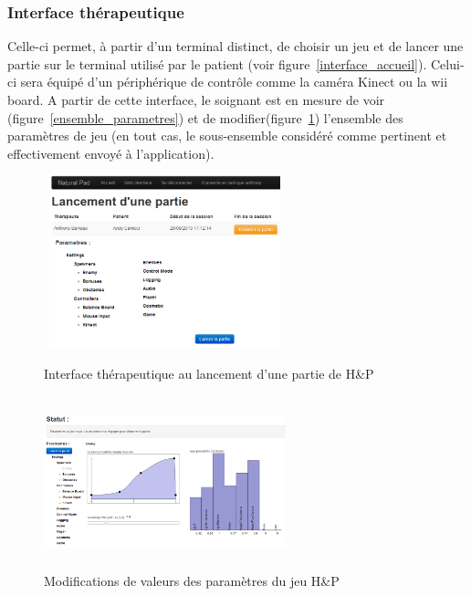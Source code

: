 	\subsubsection*{Interface thérapeutique}
Celle-ci permet, à partir d'un terminal distinct, de choisir un jeu et de lancer une partie sur le terminal utilisé par le patient (voir figure~\ref{interface_accueil}). Celui-ci sera équipé d'un périphérique de contrôle comme la caméra Kinect ou la wii board. A partir de cette interface, le soignant est en mesure de voir (figure~\ref{ensemble_parametres}) et de modifier(figure~\ref{interface_parametres}) l'ensemble des paramètres de jeu (en tout cas, le sous-ensemble considéré comme pertinent et effectivement envoyé à l'application). 
\begin{figure}[!hbtp]
	\begin{minipage}{0.48\linewidth}	
		\centering
		\includegraphics[width=7cm, height=5cm]{images/interface_accueil.png}
		\caption{Interface thérapeutique au lancement d'une partie de H\&P }
		\label{interface_accueil}
	\end{minipage}	
	\begin{minipage}{0.48\linewidth}	
		\centering
		\includegraphics[width=7cm, height=5cm]{images/interface_parametres.png}
		\caption{Modifications de valeurs des paramètres du jeu H\&P}
		\label{interface_parametres}
	\end{minipage}
\end{figure}

